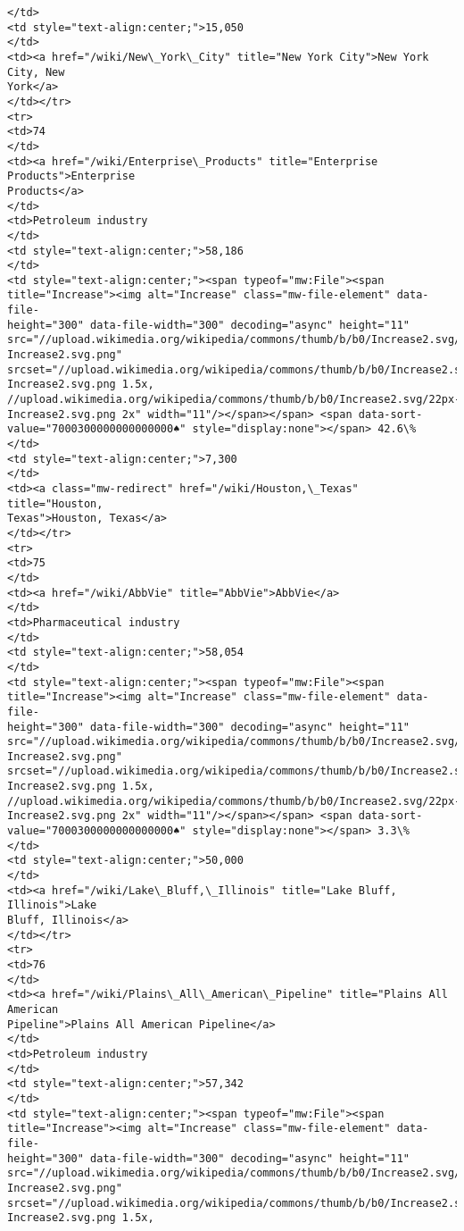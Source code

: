 \documentclass[11pt]{article}
\begin{document}
\begin{Verbatim}[commandchars=\\\{\}]
</td>
<td style="text-align:center;">15,050
</td>
<td><a href="/wiki/New\_York\_City" title="New York City">New York City, New
York</a>
</td></tr>
<tr>
<td>74
</td>
<td><a href="/wiki/Enterprise\_Products" title="Enterprise Products">Enterprise
Products</a>
</td>
<td>Petroleum industry
</td>
<td style="text-align:center;">58,186
</td>
<td style="text-align:center;"><span typeof="mw:File"><span
title="Increase"><img alt="Increase" class="mw-file-element" data-file-
height="300" data-file-width="300" decoding="async" height="11"
src="//upload.wikimedia.org/wikipedia/commons/thumb/b/b0/Increase2.svg/11px-
Increase2.svg.png"
srcset="//upload.wikimedia.org/wikipedia/commons/thumb/b/b0/Increase2.svg/17px-
Increase2.svg.png 1.5x,
//upload.wikimedia.org/wikipedia/commons/thumb/b/b0/Increase2.svg/22px-
Increase2.svg.png 2x" width="11"/></span></span> <span data-sort-
value="7000300000000000000♠" style="display:none"></span> 42.6\%
</td>
<td style="text-align:center;">7,300
</td>
<td><a class="mw-redirect" href="/wiki/Houston,\_Texas" title="Houston,
Texas">Houston, Texas</a>
</td></tr>
<tr>
<td>75
</td>
<td><a href="/wiki/AbbVie" title="AbbVie">AbbVie</a>
</td>
<td>Pharmaceutical industry
</td>
<td style="text-align:center;">58,054
</td>
<td style="text-align:center;"><span typeof="mw:File"><span
title="Increase"><img alt="Increase" class="mw-file-element" data-file-
height="300" data-file-width="300" decoding="async" height="11"
src="//upload.wikimedia.org/wikipedia/commons/thumb/b/b0/Increase2.svg/11px-
Increase2.svg.png"
srcset="//upload.wikimedia.org/wikipedia/commons/thumb/b/b0/Increase2.svg/17px-
Increase2.svg.png 1.5x,
//upload.wikimedia.org/wikipedia/commons/thumb/b/b0/Increase2.svg/22px-
Increase2.svg.png 2x" width="11"/></span></span> <span data-sort-
value="7000300000000000000♠" style="display:none"></span> 3.3\%
</td>
<td style="text-align:center;">50,000
</td>
<td><a href="/wiki/Lake\_Bluff,\_Illinois" title="Lake Bluff, Illinois">Lake
Bluff, Illinois</a>
</td></tr>
<tr>
<td>76
</td>
<td><a href="/wiki/Plains\_All\_American\_Pipeline" title="Plains All American
Pipeline">Plains All American Pipeline</a>
</td>
<td>Petroleum industry
</td>
<td style="text-align:center;">57,342
</td>
<td style="text-align:center;"><span typeof="mw:File"><span
title="Increase"><img alt="Increase" class="mw-file-element" data-file-
height="300" data-file-width="300" decoding="async" height="11"
src="//upload.wikimedia.org/wikipedia/commons/thumb/b/b0/Increase2.svg/11px-
Increase2.svg.png"
srcset="//upload.wikimedia.org/wikipedia/commons/thumb/b/b0/Increase2.svg/17px-
Increase2.svg.png 1.5x,

\end{Verbatim}
\end{document}
